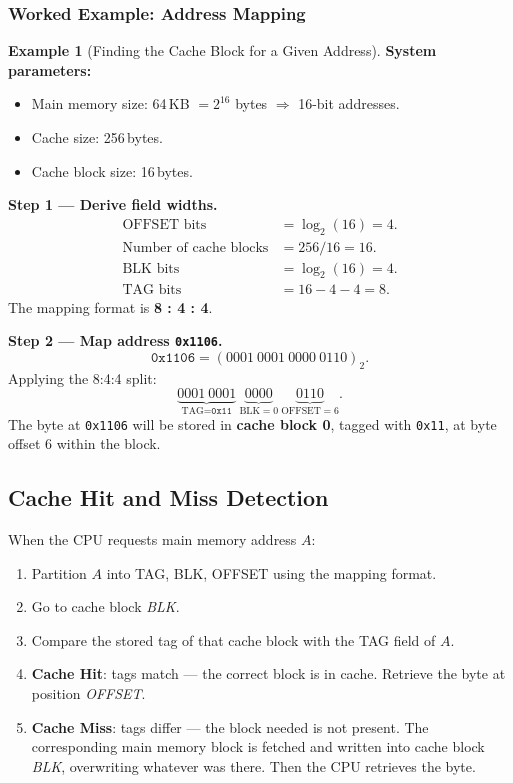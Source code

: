 \documentclass[11pt, a4paper, notitlepage]{report}
\theoremstyle{definition}
\theoremstyle{remark}
\theoremstyle{definition}
\newtheorem{example}[theorem]{Example}
\begin{document}
\subsubsection{Worked Example: Address Mapping}
\label{ex:cache-mapping}

\begin{example}[Finding the Cache Block for a Given Address]
  \label{ex:cache-map1}
  \textbf{System parameters:}
  \begin{itemize}
    \item Main memory size: 64\,KB $= 2^{16}$ bytes $\Rightarrow$ 16-bit addresses.
    \item Cache size: 256\,bytes.
    \item Cache block size: 16\,bytes.
  \end{itemize}

  \textbf{Step 1 — Derive field widths.}
  \begin{align*}
    \text{OFFSET bits} &= \log_2(16) = 4. \\
    \text{Number of cache blocks} &= 256 / 16 = 16. \\
    \text{BLK bits} &= \log_2(16) = 4. \\
    \text{TAG bits} &= 16 - 4 - 4 = 8.
  \end{align*}
  The mapping format is \textbf{8 : 4 : 4}.

  \textbf{Step 2 — Map address \texttt{0x1106}.}
  \[
    \texttt{0x1106} = (0001\ 0001\ 0000\ 0110)_2.
  \]
  Applying the 8:4:4 split:
  \[
    \underbrace{0001\ 0001}_{\text{TAG} = \texttt{0x11}}\ \underbrace{0000}_{\text{BLK} = 0}\ \underbrace{0110}_{\text{OFFSET} = 6}.
  \]
  The byte at \texttt{0x1106} will be stored in \textbf{cache block 0}, tagged with \texttt{0x11}, at byte offset 6 within the block.
\end{example}

\subsection{Cache Hit and Miss Detection}
\label{sec:hit-miss}

When the CPU requests main memory address $A$:
\begin{enumerate}
  \item Partition $A$ into TAG, BLK, OFFSET using the mapping format.
  \item Go to cache block \emph{BLK}.
  \item Compare the stored tag of that cache block with the TAG field of $A$.
  \item \textbf{Cache Hit}: tags match — the correct block is in cache. Retrieve the byte at position \emph{OFFSET}.
  \item \textbf{Cache Miss}: tags differ — the block needed is not present. The corresponding main memory block is fetched and written into cache block \emph{BLK}, overwriting whatever was there. Then the CPU retrieves the byte.
\end{enumerate}
\end{document}
